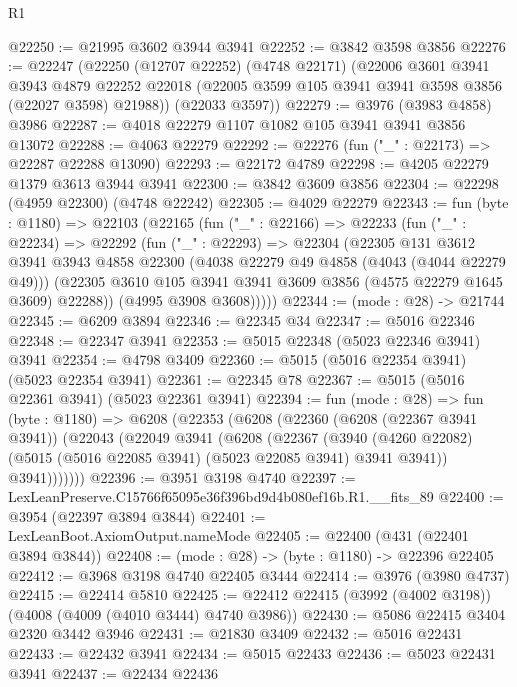 \begin{lexlean}{R1}
\begin{coremodule}
@22250 := @21995 @3602 @3944 @3941
@22252 := @3842 @3598 @3856
@22276 := @22247
    (@22250
      (@12707 @22252)
      (@4748 @22171)
      (@22006
        @3601
        @3941
        @3943
        @4879
        @22252
        @22018
        (@22005 @3599 @105 @3941 @3941 @3598 @3856 (@22027 @3598) @21988))
      (@22033 @3597))
@22279 := @3976 (@3983 @4858) @3986
@22287 := @4018 @22279 @1107 @1082 @105 @3941 @3941 @3856 @13072
@22288 := @4063 @22279
@22292 := @22276 (fun ("_" : @22173) => @22287 @22288 @13090)
@22293 := @22172 @4789
@22298 := @4205 @22279 @1379 @3613 @3944 @3941
@22300 := @3842 @3609 @3856
@22304 := @22298 (@4959 @22300) (@4748 @22242)
@22305 := @4029 @22279
@22343 := fun (byte : @1180) =>
  @22103
    (@22165
      (fun ("_" : @22166) =>
      @22233
        (fun ("_" : @22234) =>
        @22292
          (fun ("_" : @22293) =>
          @22304
            (@22305
              @131
              @3612
              @3941
              @3943
              @4858
              @22300
              (@4038 @22279 @49 @4858 (@4043 (@4044 @22279 @49)))
              (@22305 @3610 @105 @3941 @3941 @3609 @3856 (@4575 @22279 @1645 @3609) @22288))
            (@4995 @3908 @3608)))))
@22344 := (mode : @28) -> @21744
@22345 := @6209 @3894
@22346 := @22345 @34
@22347 := @5016 @22346
@22348 := @22347 @3941
@22353 := @5015 @22348 (@5023 @22346 @3941) @3941
@22354 := @4798 @3409
@22360 := @5015 (@5016 @22354 @3941) (@5023 @22354 @3941)
@22361 := @22345 @78
@22367 := @5015 (@5016 @22361 @3941) (@5023 @22361 @3941)
@22394 := fun (mode : @28) =>
  fun (byte : @1180) =>
  @6208
    (@22353
      (@6208
        (@22360
          (@6208 (@22367 @3941 @3941))
          (@22043
            (@22049
              @3941
              (@6208
                (@22367
                  (@3940
                    (@4260 @22082)
                    (@5015 (@5016 @22085 @3941) (@5023 @22085 @3941) @3941 @3941))
                  @3941)))))))
@22396 := @3951 @3198 @4740
@22397 := LexLeanPreserve.C15766f65095e36f396bd9d4b080ef16b.R1.__fits_89
@22400 := @3954 (@22397 @3894 @3844)
@22401 := LexLeanBoot.AxiomOutput.nameMode
@22405 := @22400 (@431 (@22401 @3894 @3844))
@22408 := (mode : @28) -> (byte : @1180) -> @22396 @22405
@22412 := @3968 @3198 @4740 @22405 @3444
@22414 := @3976 (@3980 @4737)
@22415 := @22414 @5810
@22425 := @22412 @22415 (@3992 (@4002 @3198)) (@4008 (@4009 (@4010 @3444) @4740 @3986))
@22430 := @5086 @22415 @3404 @2320 @3442 @3946
@22431 := @21830 @3409
@22432 := @5016 @22431
@22433 := @22432 @3941
@22434 := @5015 @22433
@22436 := @5023 @22431 @3941
@22437 := @22434 @22436

\end{coremodule}
\end{lexlean}
